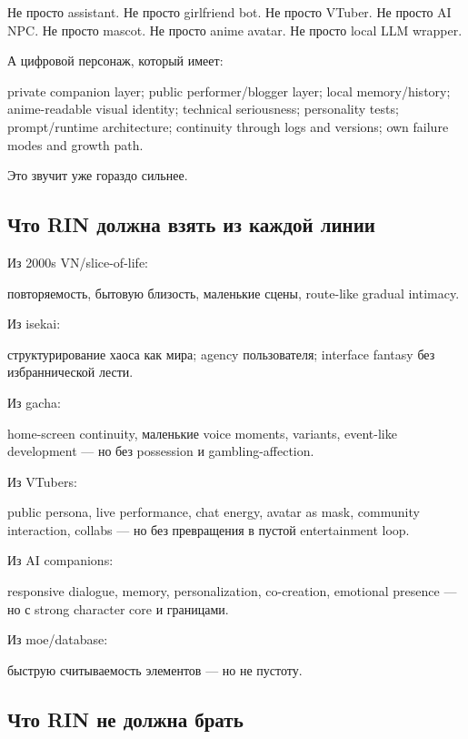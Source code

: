 Не просто assistant. Не просто girlfriend bot. Не просто VTuber. Не
просто AI NPC. Не просто mascot. Не просто anime avatar. Не просто local
LLM wrapper.

А цифровой персонаж, который имеет:

private companion layer; public performer/\hspace{0pt}blogger layer; local
memory/\hspace{0pt}history; anime-readable visual identity; technical seriousness;
personality tests; prompt/\hspace{0pt}runtime architecture; continuity through logs
and versions; own failure modes and growth path.

Это звучит уже гораздо сильнее.

\subsection*{Что RIN должна взять из каждой линии}

Из 2000s VN/\hspace{0pt}slice-of-life:

повторяемость, бытовую близость, маленькие сцены, route-like gradual
intimacy.

Из isekai:

структурирование хаоса как мира; agency пользователя; interface fantasy
без избраннической лести.

Из gacha:

home-screen continuity, маленькие voice moments, variants, event-like
development --- но без possession и gambling-affection.

Из VTubers:

public persona, live performance, chat energy, avatar as mask, community
interaction, collabs --- но без превращения в пустой entertainment loop.

Из AI companions:

responsive dialogue, memory, personalization, co-creation, emotional
presence --- но с strong character core и границами.

Из moe/\hspace{0pt}database:

быструю считываемость элементов --- но не пустоту.

\subsection*{Что RIN не должна брать}

